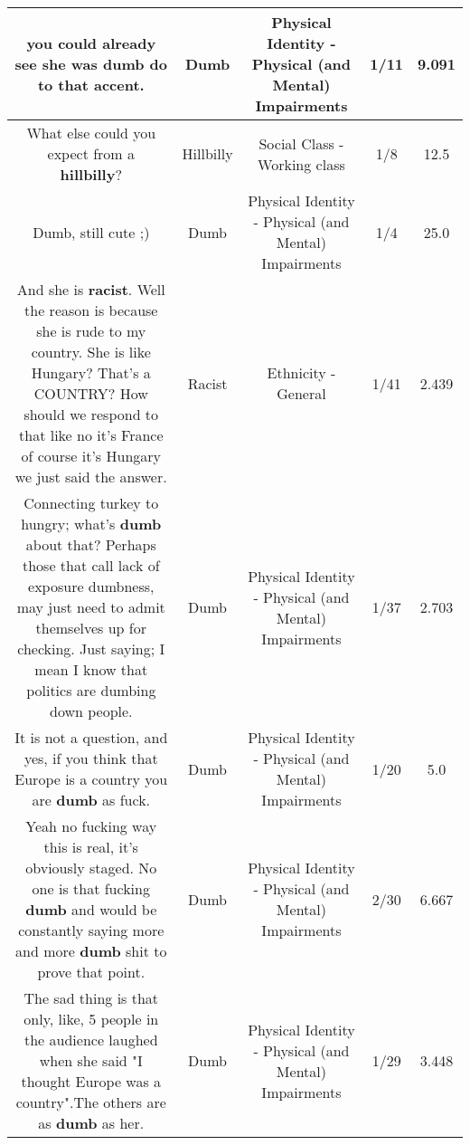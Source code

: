 \documentclass[11pt]{article}
\newlength\mylength
\begin{document}
\begin{center}
\begin{longtable}{|C{.65\mylength}|C{.30\mylength}|C{.12\mylength}|C{.12\mylength}|C{.12\mylength}|}
  \small you could already see she was \textbf{dumb} do to that accent.\normalsize   & Dumb & Physical Identity - Physical (and Mental) Impairments & 1/11 & 9.091 \\  \hline
  \small What else could you expect from a \textbf{hillbilly}?\normalsize   & Hillbilly & Social Class - Working class & 1/8 & 12.5 \\  \hline
  \small Dumb, still cute ;)\normalsize   & Dumb & Physical Identity - Physical (and Mental) Impairments & 1/4 & 25.0 \\  \hline
  \small And she is \textbf{racist}. Well the reason is because she is rude to my country. She is like Hungary? That's a COUNTRY?  How should we respond to that like no it's France of course it's Hungary we just said the answer.\normalsize   & Racist & Ethnicity - General & 1/41 & 2.439 \\  \hline
  \small Connecting turkey to hungry; what's \textbf{dumb} about that? Perhaps those that call lack of exposure dumbness, may just need to admit themselves up for checking. Just saying; I mean I know that politics are dumbing down people.\normalsize   & Dumb & Physical Identity - Physical (and Mental) Impairments & 1/37 & 2.703 \\  \hline
  \small It is not a question, and yes, if you think that Europe is a country you are \textbf{dumb} as fuck.\normalsize   & Dumb & Physical Identity - Physical (and Mental) Impairments & 1/20 & 5.0 \\  \hline
  \small Yeah no fucking way this is real, it's obviously staged. No one is that fucking \textbf{dumb} and would be constantly saying more and more \textbf{dumb} shit to prove that point.\normalsize   & Dumb & Physical Identity - Physical (and Mental) Impairments & 2/30 & 6.667 \\  \hline
  \small The sad thing is that only, like, 5 people in the audience laughed when she said "I thought Europe was a country".The others are as \textbf{dumb} as her.\normalsize   & Dumb & Physical Identity - Physical (and Mental) Impairments & 1/29 & 3.448 \\  \hline

\end{longtable}
\end{center}
\end{document}
